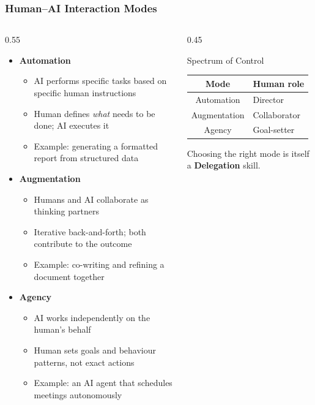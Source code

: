 \begin{frame}[fragile]\frametitle{Human--AI Interaction Modes}
\begin{columns}
    \begin{column}[T]{0.55\linewidth}
      \begin{itemize}
        \item \textbf{Automation}
          \begin{itemize}
            \item AI performs specific tasks based on specific human instructions
            \item Human defines \emph{what} needs to be done; AI executes it
            \item Example: generating a formatted report from structured data
          \end{itemize}
        \item \textbf{Augmentation}
          \begin{itemize}
            \item Humans and AI collaborate as thinking partners
            \item Iterative back-and-forth; both contribute to the outcome
            \item Example: co-writing and refining a document together
          \end{itemize}
        \item \textbf{Agency}
          \begin{itemize}
            \item AI works independently on the human's behalf
            \item Human sets goals and behaviour patterns, not exact actions
            \item Example: an AI agent that schedules meetings autonomously
          \end{itemize}
      \end{itemize}
    \end{column}
    \begin{column}[T]{0.45\linewidth}
      \begin{block}{Spectrum of Control}
        \begin{center}
          \begin{tabular}{cl}
            \textbf{Mode} & \textbf{Human role} \\
            \hline
            Automation  & Director \\
            Augmentation & Collaborator \\
            Agency      & Goal-setter \\
          \end{tabular}
        \end{center}
      \end{block}
      \vspace{0.4em}
      Choosing the right mode is itself a \textbf{Delegation} skill.
    \end{column}
  \end{columns}
\end{frame}

